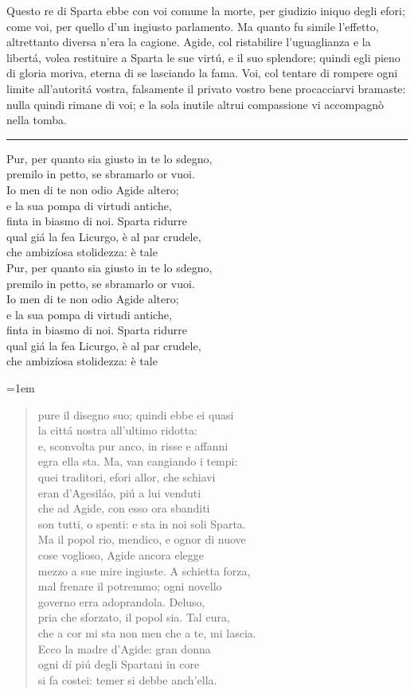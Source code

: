\documentclass[a5paper,11pt]{book}
\def\testodicontrollo{%
Questo re di Sparta ebbe con voi comune la morte, per giudizio
iniquo degli efori; come voi, per quello d'un ingiusto parlamento.
Ma quanto fu simile l'effetto, altrettanto diversa n'era la
cagione. Agide, col ristabilire l'uguaglianza e la libertá, volea
restituire a Sparta le sue virtú, e il suo splendore; quindi egli
pieno di gloria moriva, eterna di se lasciando la fama. Voi, col
tentare di rompere ogni limite all'autoritá vostra, falsamente il
privato vostro bene procacciarvi bramaste: nulla quindi rimane di
voi; e la sola inutile altrui compassione vi accompagnò nella
tomba.
}
\begin{document}
\testodicontrollo

\noindent\rule{\leftmargini}{1pt}

\begin{versedrama}
  Pur, per quanto sia giusto in te lo sdegno,\\
  premilo in petto, se sbramarlo or vuoi.\\
  Io men di te non odio Agide altero;\\
  e la sua pompa di virtudi antiche,\\
  finta in biasmo di noi. Sparta ridurre\\
  qual giá la fea Licurgo, è al par crudele,\\
  che ambizíosa stolidezza: è tale\\
  Pur, per quanto sia giusto in te lo sdegno,\\
  premilo in petto, se sbramarlo or vuoi.\\
  Io men di te non odio Agide altero;\\
  e la sua pompa di virtudi antiche,\\
  finta in biasmo di noi. Sparta ridurre\\
  qual giá la fea Licurgo, è al par crudele,\\
  che ambizíosa stolidezza: è tale\\
\end{versedrama}

\leftmargini=1em

\begin{verse}
  pure il disegno suo; quindi ebbe ei quasi\\
  la cittá nostra all'ultimo ridotta:\\
  e, sconvolta pur anco, in risse e affanni\\
  egra ella sta. Ma, van cangiando i tempi:\\
  quei traditori, efori allor, che schiavi\\
  eran d'Agesiláo, piú a lui venduti\\
  che ad Agide, con esso ora sbanditi\\
  son tutti, o spenti: e sta in noi soli Sparta.\\
  Ma il popol rio, mendico, e ognor di nuove\\
  cose voglioso, Agide ancora elegge\\
  mezzo a sue mire ingiuste. A schietta forza,\\
  mal frenare il potremmo; ogni novello\\
  governo erra adoprandola. Deluso,\\
  pria che sforzato, il popol sia. Tal cura,\\
  che a cor mi sta non men che a te, mi lascia.\\
  Ecco la madre d'Agide: gran donna\\
  ogni dí piú degli Spartani in core\\
  si fa costei: temer si debbe anch'ella.\\
\end{verse}
\end{document}
